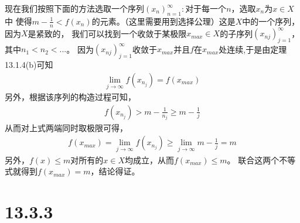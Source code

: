 \documentclass{article}
\begin{document}
现在我们按照下面的方法选取一个序列$(x_n)_{n = 1}^\infty :$对于每一个$n$，选取$x_n$为$x \in X$中
使得$m - \frac{1}{n} < f(x_n)$的元素。（这里需要用到选择公理）这是$X$中的一个序列，因为$X$是紧致的，
我们可以找到一个收敛于某极限$x_{max} \in X$的子序列$(x_{nj})_{j = 1}^\infty$，其中$n_1 < n_2 < ...$。
因为$(x_{nj})_{j = 1}^\infty$收敛于$x_{max}$并且$f$在$x_{max}$处连续,于是由定理13.1.4(b)可知
\begin{align*}
  \lim\limits_{j \to \infty}f(x_{n_j}) = f(x_{max})
\end{align*}
另外，根据该序列的构造过程可知，
\begin{align*}
  f(x_{n_j}) > m - \frac{1}{n_j} \geq m - \frac{1}{j}
\end{align*}
从而对上式两端同时取极限可得，
\begin{align*}
  f(x_{max}) = \lim\limits_{j \to \infty}f(x_{n_j}) \geq \lim\limits_{j \to \infty} m - \frac{1}{j} = m
\end{align*}
另外，$f(x) \leq m$对所有的$x \in X$均成立，从而$f(x_{max}) \leq m$。
联合这两个不等式就得到$f(x_{max}) = m$，结论得证。

\section*{13.3.3}
\end{document}
